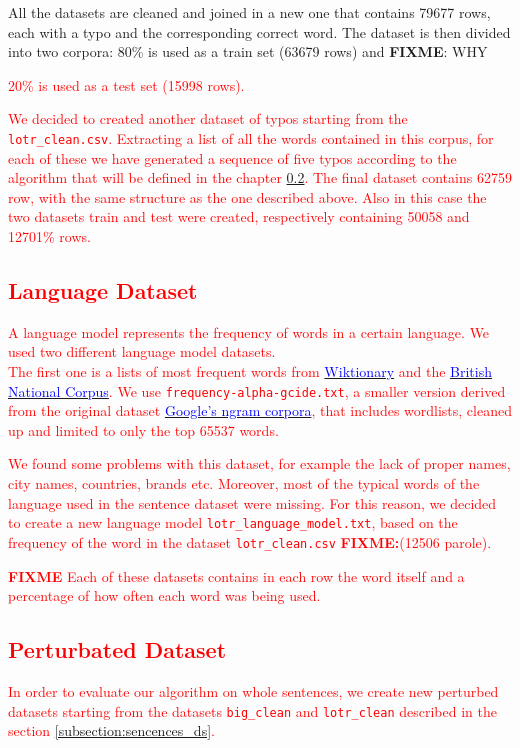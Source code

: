 All the datasets are cleaned and joined in a new one that contains \num{79677} rows, each with a typo and the 
corresponding correct word.
The dataset is then divided into two corpora: \num{80}\% is used as a train set (\num{63679} rows) and 
\textbf{FIXME}: {WHY}\textcolor{red}{
\num{20}\% is used as a test set (\num{15998} rows).


\textcolor{red}{
	We decided to created another dataset of typos starting from the \\\texttt{lotr\_clean.csv}. 
	Extracting a list of all the words contained in this corpus, for each of these we have generated a sequence of 
	five typos according to the algorithm that will be defined in the chapter \ref{subsection:perturbed}.
	The final dataset contains \num{62759} row, with the same structure as the one described above.
	Also in this case the two datasets train and test were created, respectively containing \num{50058} and 
	\num{12701}\% rows.}

\subsection{Language Dataset}
A language model represents the frequency of words in a certain language.
We used two different language model datasets. \\
The first one is a lists of most frequent words from 
\href{https://en.wiktionary.org/wiki/Wiktionary:Frequency_lists}{ 
	\textcolor{blue}{Wiktionary}} and the 
	\href{http://www.kilgarriff.co.uk/bnc-readme.html}{\textcolor{blue}{British National Corpus}}. 
We use \texttt{frequency-alpha-gcide.txt}, a smaller version derived from the original dataset 
\href{https://books.google.com/ngrams/}{\textcolor{blue}{Google's ngram corpora}}, that includes wordlists, 
cleaned up and limited to only the top \num{65537} words.

We found some problems with this dataset, for example the lack of proper names, city names, countries, brands 
etc.
Moreover, most of the typical words of the language used in the sentence dataset were missing.
For this reason, we decided to create a new language model \texttt{lotr\_language\_model.txt}, based on the 
frequency of the word in the dataset \texttt{lotr\_clean.csv} \textbf{FIXME:}(12506 parole).

\textbf{FIXME}{
	Each of these datasets contains in each row the word itself and a percentage of how often each word was 
	being used.}

\subsection{Perturbated Dataset}
\label{subsection:perturbed}
In order to evaluate our algorithm on whole sentences, we create new perturbed datasets starting from the 
datasets \texttt{big\_clean} and \texttt{lotr\_clean} described in the section \ref{subsection:sencences_ds}.

}
